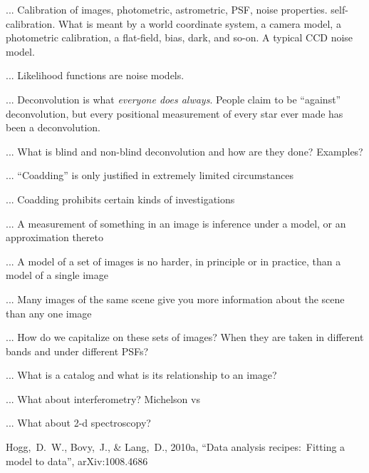 \documentclass[12pt,twoside,pdftex]{article}
\begin{document}
... Calibration of images, photometric, astrometric, PSF, noise
properties.  self-calibration.  What is meant by a world coordinate
system, a camera model, a photometric calibration, a flat-field, bias,
dark, and so-on.  A typical CCD noise model.

... Likelihood functions are noise models.

... Deconvolution is what \emph{everyone does always}.  People claim
to be ``against'' deconvolution, but every positional measurement of
every star ever made has been a deconvolution.

... What is blind and non-blind deconvolution and how are they done?
Examples?
 
... ``Coadding'' is only justified in extremely limited circumstances

... Coadding prohibits certain kinds of investigations

... A measurement of something in an image is inference under a model, or an approximation thereto

... A model of a set of images is no harder, in principle or in practice, than a model of a single image

... Many images of the same scene give you more information about the scene than any one image

... How do we capitalize on these sets of images?  When they are taken in different bands and under different PSFs?

... What is a catalog and what is its relationship to an image?

... What about interferometry?  Michelson vs 

... What about 2-d spectroscopy?

\clearpage
{}\theendnotes

\clearpage
\begin{thebibliography}{}\raggedright
{}
  Hogg,~D.~W., Bovy,~J., \& Lang,~D., 2010a,
  ``Data analysis recipes:\ Fitting a model to data'', arXiv:1008.4686
\end{thebibliography}
\end{document}

